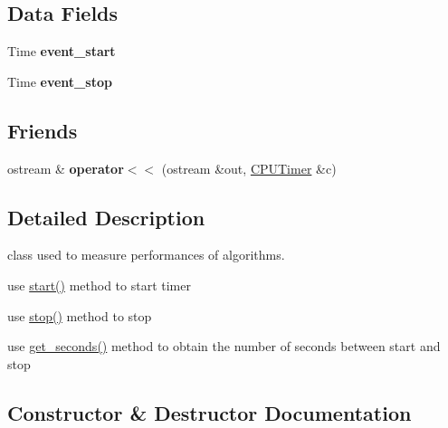 \subsection*{Data Fields}
\begin{DoxyCompactItemize}
\item 
\mbox{\label{classez_1_1essential_1_1CPUTimer_a9153ec33fb7ea258b0633eb183d792d1}} 
Time {\bfseries event\+\_\+start}
\item 
\mbox{\label{classez_1_1essential_1_1CPUTimer_a3b76f40057f1d012e4c33a4923047923}} 
Time {\bfseries event\+\_\+stop}
\end{DoxyCompactItemize}
\subsection*{Friends}
\begin{DoxyCompactItemize}
\item 
\mbox{\label{classez_1_1essential_1_1CPUTimer_a50a6415ed758f854d5211347e860452a}} 
ostream \& {\bfseries operator$<$$<$} (ostream \&out, \hyperlink{classez_1_1essential_1_1CPUTimer}{C\+P\+U\+Timer} \&c)
\end{DoxyCompactItemize}


\subsection{Detailed Description}
class used to measure performances of algorithms. 
\begin{DoxyItemize}
\item use \hyperlink{classez_1_1essential_1_1CPUTimer_a2117cc7fd9f933bb0c6d28fdf9a9f74a}{start()} method to start timer 
\item use \hyperlink{classez_1_1essential_1_1CPUTimer_a318dfb72b3b7e61ab90ea3699e7d66a6}{stop()} method to stop 
\item use \hyperlink{classez_1_1essential_1_1CPUTimer_a5514bcd6ee6e46961b66497bf5b27751}{get\+\_\+seconds()} method to obtain the number of seconds between start and stop 
\end{DoxyItemize}

\subsection{Constructor \& Destructor Documentation}
\mbox{\label{classez_1_1essential_1_1CPUTimer_aa06f8e13b3c82bbb8642f4981bfff7e7}} 
